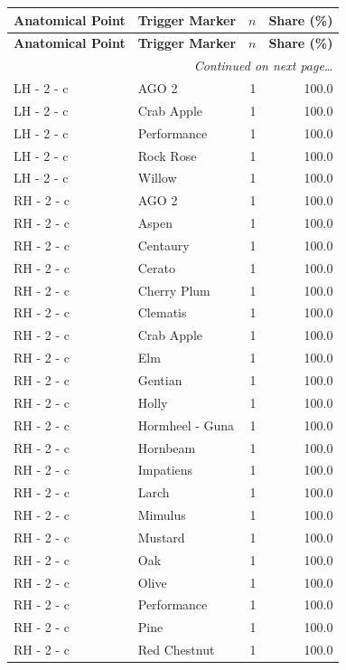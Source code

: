 \documentclass[a4paper,11pt]{article}
\begin{document}
\begin{footnotesize}
\begin{longtable}{p{3.5cm}p{7.5cm}rr}
\toprule
\textbf{Anatomical Point} &
\textbf{Trigger Marker} &
\textbf{$n$} &
\textbf{Share (\%)} \\
\midrule
\endfirsthead
\toprule
\textbf{Anatomical Point} &
\textbf{Trigger Marker} &
\textbf{$n$} &
\textbf{Share (\%)} \\
\midrule
\endhead
\midrule
\multicolumn{4}{r}{\footnotesize\emph{Continued on next page\ldots}} \\
\endfoot
\bottomrule
\endlastfoot
LH - 2 - c & AGO 2 & 1 & 100.0 \\
LH - 2 - c & Crab Apple & 1 & 100.0 \\
LH - 2 - c & Performance & 1 & 100.0 \\
LH - 2 - c & Rock Rose & 1 & 100.0 \\
LH - 2 - c & Willow & 1 & 100.0 \\
RH - 2 - c & AGO 2 & 1 & 100.0 \\
RH - 2 - c & Aspen & 1 & 100.0 \\
RH - 2 - c & Centaury & 1 & 100.0 \\
RH - 2 - c & Cerato & 1 & 100.0 \\
RH - 2 - c & Cherry Plum & 1 & 100.0 \\
RH - 2 - c & Clematis & 1 & 100.0 \\
RH - 2 - c & Crab Apple & 1 & 100.0 \\
RH - 2 - c & Elm & 1 & 100.0 \\
RH - 2 - c & Gentian & 1 & 100.0 \\
RH - 2 - c & Holly & 1 & 100.0 \\
RH - 2 - c & Hormheel - Guna & 1 & 100.0 \\
RH - 2 - c & Hornbeam & 1 & 100.0 \\
RH - 2 - c & Impatiens & 1 & 100.0 \\
RH - 2 - c & Larch & 1 & 100.0 \\
RH - 2 - c & Mimulus & 1 & 100.0 \\
RH - 2 - c & Mustard & 1 & 100.0 \\
RH - 2 - c & Oak & 1 & 100.0 \\
RH - 2 - c & Olive & 1 & 100.0 \\
RH - 2 - c & Performance & 1 & 100.0 \\
RH - 2 - c & Pine & 1 & 100.0 \\
RH - 2 - c & Red Chestnut & 1 & 100.0 \\

\end{longtable}
\end{footnotesize}
\end{document}
